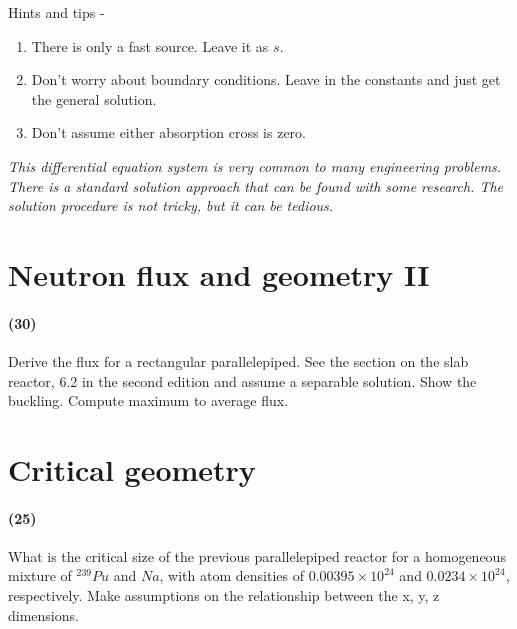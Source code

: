 \documentclass[11pt,a4paper]{article}
\begin{document}
\noindent Hints and tips - 
\begin{enumerate}[leftmargin=*,topsep=0pt,label=\alph*.]
    \item There is only a fast source. Leave it as $s$.
    \item Don't worry about boundary conditions. Leave in the constants and just get the general solution.
    \item Don't assume either absorption cross is zero.
\end{enumerate}

\vspace{\baselineskip}

\noindent\textit{This differential equation system is very common to many engineering problems. There is a standard solution approach that can be found with some research. The solution procedure is not tricky, but it can be tedious.}





\newpage

\section{Neutron flux and geometry II}
\paragraph*{(30)}
Derive the flux for a rectangular parallelepiped. See the section on the slab reactor, 6.2 in the second edition and assume a separable solution. Show the buckling. Compute maximum to average flux.





\newpage

\section{Critical geometry}
\paragraph*{(25)}
What is the critical size of the previous parallelepiped reactor for a homogeneous mixture of $^{239}Pu$ and $Na$, with atom densities of $0.00395 \times 10^{24}$ and $0.0234 \times 10^{24}$, respectively. Make assumptions on the relationship between the x, y, z dimensions.





\newpage
\end{document}
